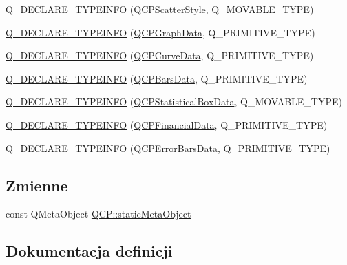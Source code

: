 \begin{DoxyCompactItemize}
\item 
\hyperlink{qcustomplot_8hh_adb726938bdfce1d1136855b9b3613d2e}{Q\+\_\+\+D\+E\+C\+L\+A\+R\+E\+\_\+\+T\+Y\+P\+E\+I\+N\+FO} (\hyperlink{class_q_c_p_scatter_style}{Q\+C\+P\+Scatter\+Style}, Q\+\_\+\+M\+O\+V\+A\+B\+L\+E\+\_\+\+T\+Y\+PE)
\item 
\hyperlink{qcustomplot_8hh_a422c3e935fcaf8b1e0cfd18e0672e54b}{Q\+\_\+\+D\+E\+C\+L\+A\+R\+E\+\_\+\+T\+Y\+P\+E\+I\+N\+FO} (\hyperlink{class_q_c_p_graph_data}{Q\+C\+P\+Graph\+Data}, Q\+\_\+\+P\+R\+I\+M\+I\+T\+I\+V\+E\+\_\+\+T\+Y\+PE)
\item 
\hyperlink{qcustomplot_8hh_aa7fac95baf023cd00e99dffdb545b1a3}{Q\+\_\+\+D\+E\+C\+L\+A\+R\+E\+\_\+\+T\+Y\+P\+E\+I\+N\+FO} (\hyperlink{class_q_c_p_curve_data}{Q\+C\+P\+Curve\+Data}, Q\+\_\+\+P\+R\+I\+M\+I\+T\+I\+V\+E\+\_\+\+T\+Y\+PE)
\item 
\hyperlink{qcustomplot_8hh_af5914e844cd48c5f0332a4acaafb4461}{Q\+\_\+\+D\+E\+C\+L\+A\+R\+E\+\_\+\+T\+Y\+P\+E\+I\+N\+FO} (\hyperlink{class_q_c_p_bars_data}{Q\+C\+P\+Bars\+Data}, Q\+\_\+\+P\+R\+I\+M\+I\+T\+I\+V\+E\+\_\+\+T\+Y\+PE)
\item 
\hyperlink{qcustomplot_8hh_adfb047f77f52e89d50655c95ea5469e2}{Q\+\_\+\+D\+E\+C\+L\+A\+R\+E\+\_\+\+T\+Y\+P\+E\+I\+N\+FO} (\hyperlink{class_q_c_p_statistical_box_data}{Q\+C\+P\+Statistical\+Box\+Data}, Q\+\_\+\+M\+O\+V\+A\+B\+L\+E\+\_\+\+T\+Y\+PE)
\item 
\hyperlink{qcustomplot_8hh_a1235fc5306324b607571019cbeeae197}{Q\+\_\+\+D\+E\+C\+L\+A\+R\+E\+\_\+\+T\+Y\+P\+E\+I\+N\+FO} (\hyperlink{class_q_c_p_financial_data}{Q\+C\+P\+Financial\+Data}, Q\+\_\+\+P\+R\+I\+M\+I\+T\+I\+V\+E\+\_\+\+T\+Y\+PE)
\item 
\hyperlink{qcustomplot_8hh_ada5a683e023b10f971a90bffed67e408}{Q\+\_\+\+D\+E\+C\+L\+A\+R\+E\+\_\+\+T\+Y\+P\+E\+I\+N\+FO} (\hyperlink{class_q_c_p_error_bars_data}{Q\+C\+P\+Error\+Bars\+Data}, Q\+\_\+\+P\+R\+I\+M\+I\+T\+I\+V\+E\+\_\+\+T\+Y\+PE)
\end{DoxyCompactItemize}
\subsection*{Zmienne}
\begin{DoxyCompactItemize}
\item 
const Q\+Meta\+Object \hyperlink{namespace_q_c_p_a07ffa1eb1537a3b1f218ff2a442b2017}{Q\+C\+P\+::static\+Meta\+Object}
\end{DoxyCompactItemize}


\subsection{Dokumentacja definicji}
